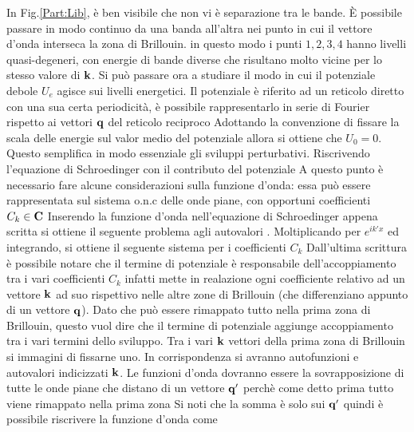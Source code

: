 \documentclass[a4paper,12pt]{article}
\begin{document}
In Fig.\ref{Part:Lib}, è ben visibile che non vi è separazione tra le bande. \`E possibile passare in modo continuo da una banda all'altra nei punto in cui il vettore d'onda interseca la zona di Brillouin. in questo modo i punti $1,2,3,4$ hanno livelli quasi-degeneri, con energie di bande diverse che risultano molto vicine per lo stesso valore di $\it\bf k$. Si può passare ora a studiare il modo in cui il potenziale debole $U_e$ agisce sui livelli energetici. Il potenziale è riferito ad un reticolo diretto con una sua certa periodicità, è possibile rappresentarlo in serie di Fourier rispetto ai vettori $\it\bf q$ del reticolo reciproco 
Adottando la convenzione di fissare la scala delle energie sul valor medio del potenziale allora si ottiene che $U_0=0$. Questo semplifica in modo essenziale gli sviluppi perturbativi. Riscrivendo l'equazione di Schroedinger con il contributo del potenziale
A questo punto è necessario fare alcune considerazioni sulla funzione d'onda: essa può essere rappresentata sul sistema o.n.c delle onde piane, con opportuni coefficienti $C_k\in\mathbf{C}$
Inserendo la funzione d'onda nell'equazione di Schroedinger appena scritta si ottiene il seguente problema agli autovalori
.
Moltiplicando per $e^{ik'x}$ ed integrando, si ottiene il seguente sistema per i coefficienti $C_k$
Dall'ultima scrittura è possibile notare che il termine di potenziale è responsabile dell'accoppiamento tra i vari coefficienti $C_k$ infatti mette in realazione ogni coefficiente relativo ad un vettore $\it\bf k$ ad suo rispettivo nelle altre zone di Brillouin (che differenziano appunto di un vettore $\it\bf q$). Dato che può essere rimappato tutto nella prima zona di Brillouin, questo vuol dire che il termine di potenziale aggiunge accoppiamento tra i vari termini dello sviluppo. Tra i vari $\it\bf k$ vettori della prima zona di Brillouin si immagini di fissarne uno. In corrispondenza si avranno autofunzioni e autovalori indicizzati $\it\bf k$. Le funzioni d'onda dovranno essere la sovrapposizione di tutte le onde piane che distano di un vettore $\it\bf q'$ perchè come detto prima tutto viene rimappato nella prima zona
Si noti che la somma è solo sui $\it\bf q'$ quindi è possibile riscrivere la funzione d'onda come
\end{document}
